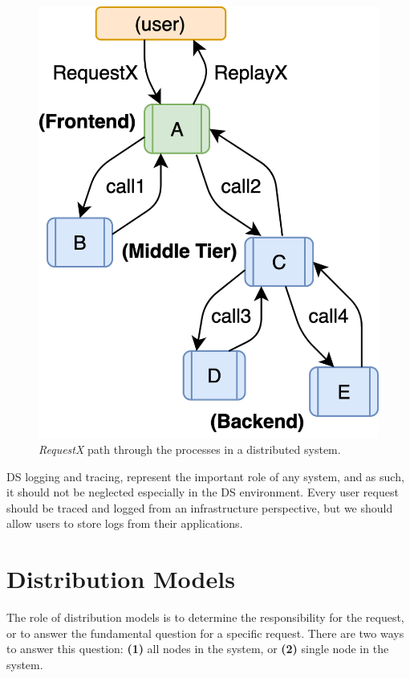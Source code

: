 \begin{figure}[H]
	\begin{center}
		\includegraphics[scale=1]{images/Figure18}
	\end{center}
	\vspace{-0.9cm}
	\caption{\textit{RequestX} path through the processes in a distributed system.}
	\label{fig:fig18}
\end{figure}

\noindent
DS logging and tracing, represent the important role of any system, and as such, it should not be neglected especially in the DS environment. Every user request should be traced and logged from an infrastructure perspective, but we should allow users to store logs from their applications.
%
%
\section{Distribution Models}\label{sec:distribution_models}
%
The role of distribution models is to determine the responsibility for the request, or to answer the fundamental question  for a specific request. There are two ways to answer this question: \textbf{(1)} all nodes in the system, or \textbf{(2)} single node in the system.
%
%
